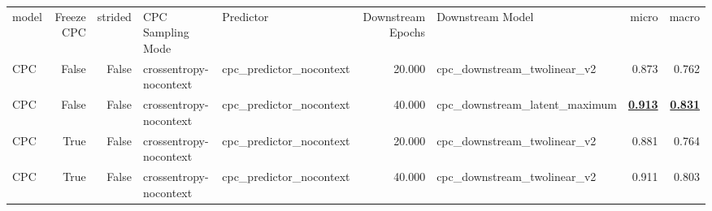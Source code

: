\begin{adjustbox}{width=\textwidth}
\begin{tabular}{lrrllrlrr}
{model} & {Freeze CPC} & {strided} & {CPC Sampling Mode} & {Predictor} & {Downstream Epochs} & {Downstream Model} & {micro} & {macro} \\
CPC & False & False & crossentropy-nocontext & cpc\_predictor\_nocontext & 20.000 & cpc\_downstream\_twolinear\_v2 & 0.873 & 0.762 \\
CPC & False & False & crossentropy-nocontext & cpc\_predictor\_nocontext & 40.000 & cpc\_downstream\_latent\_maximum & \bfseries \underline{0.913} & \bfseries \underline{0.831} \\
CPC & True & False & crossentropy-nocontext & cpc\_predictor\_nocontext & 20.000 & cpc\_downstream\_twolinear\_v2 & 0.881 & 0.764 \\
CPC & True & False & crossentropy-nocontext & cpc\_predictor\_nocontext & 40.000 & cpc\_downstream\_twolinear\_v2 & 0.911 & 0.803 \\
\end{tabular}
\end{adjustbox}